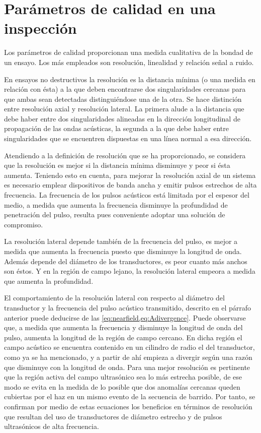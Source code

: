 \section{Parámetros de calidad en una inspección}\label{sec:quality}

Los parámetros de calidad proporcionan una medida cualitativa de la bondad
de un ensayo. Los más empleados son resolución, linealidad y relación señal
a ruido.

En ensayos no destructivos la resolución es la distancia mínima (o una
medida en relación con ésta) a la que deben encontrarse dos singularidades
cercanas para que ambas sean detectadas distinguiéndose una de la otra. Se
hace distinción entre resolución axial y resolución lateral. La primera
alude a la distancia que debe haber entre dos singularidades alineadas en
la dirección longitudinal de propagación de las ondas acústicas, la segunda
a la que debe haber entre singularidades que se encuentren dispuestas en
una línea normal a esa dirección.

Atendiendo a la definición de resolución que se ha proporcionado, se
considera que la resolución es mejor si la distancia mínima disminuye y
peor si ésta aumenta. Teniendo esto en cuenta, para mejorar la resolución
axial de un sistema es necesario emplear dispositivos de banda ancha y
emitir pulsos estrechos de alta frecuencia. La frecuencia de los pulsos
acústicos está limitada por el espesor del medio, a medida que aumenta la
frecuencia disminuye la profundidad de penetración del pulso, resulta pues
conveniente adoptar una solución de compromiso.

La resolución lateral depende también de la frecuencia del pulso, es mejor
a medida que aumenta la frecuencia puesto que disminuye la longitud de
onda. Además depende del diámetro de los transductores, es peor cuanto más
anchos son éstos. Y en la región de campo lejano, la resolución lateral
empeora a medida que aumenta la profundidad.

El comportamiento de la resolución lateral con respecto al diámetro del
transductor y la frecuencia del pulso acústico transmitido, descrito en el
párrafo anterior puede deducirse de las \cref{eq:nearfield,eq:Adivergence}.
Puede observarse que, a medida que aumenta la frecuencia y disminuye la
longitud de onda del pulso, aumenta la longitud de la región de campo
cercano. En dicha región el campo acústico se encuentra contenido en un
cilindro de radio el del transductor, como ya se ha mencionado, y a partir
de ahí empieza a divergir según una razón que disminuye con la longitud de
onda. Para una mejor resolución es pertinente que la región activa del
campo ultrasónico sea lo más estrecha posible, de ese modo se evita en la
medida de lo posible que dos anomalías cercanas queden cubiertas por el haz
en un mismo evento de la secuencia de barrido. Por tanto, se confirman por
medio de estas ecuaciones los beneficios en términos de resolución que
resultan del uso de transductores de diámetro estrecho y de pulsos
ultrasónicos de alta frecuencia.

